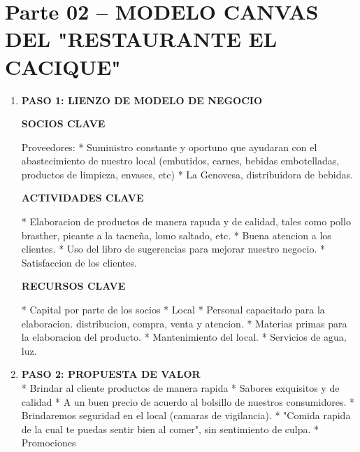 \section{Parte 02 – MODELO CANVAS DEL "RESTAURANTE EL CACIQUE"} 

\begin{enumerate}[1.]
	\item \textbf {PASO 1: LIENZO DE MODELO DE NEGOCIO} \newline
\begin{center}
\textbf {SOCIOS CLAVE} \newline
\end{center}
Proveedores: \newline
* Suministro constante y oportuno que ayudaran con el abastecimiento de nuestro local (embutidos, carnes, bebidas embotelladas, productos de limpieza, envases, etc) \newline
* La Genovesa, distribuidora de bebidas.\newline
\\ 
\begin{center}
\textbf {ACTIVIDADES CLAVE} \newline
\end{center}

* Elaboracion de productos de manera rapuda y de calidad, tales como pollo brasther, picante a la tacneña, lomo saltado, etc.\newline
* Buena atencion a los clientes.\newline
* Uso del libro de sugerencias para mejorar nuestro negocio.\newline
* Satisfaccion de los clientes.\newline
\\ 
\begin{center}
\textbf {RECURSOS CLAVE} \newline
\end{center}

* Capital por parte de los socios\newline
* Local \newline
* Personal capacitado para la elaboracion. distribucion, compra, venta y atencion.\newline
* Materias primas para la elaboracion del producto.\newline
* Mantenimiento del local.\newline
* Servicios de agua, luz.\newline

\item \textbf {PASO 2: PROPUESTA DE VALOR} \newline
\\
* Brindar al cliente productos de manera rapida\newline
* Sabores exquisitos y de calidad\newline
* A un  buen precio de acuerdo al bolsillo de nuestros consumidores.\newline
* Brindaremos seguridad en el local (camaras de vigilancia).\newline
* "Comida rapida de la cual te puedas sentir bien al comer", sin sentimiento de culpa.\newline
* Promociones\newline


\end{enumerate}
